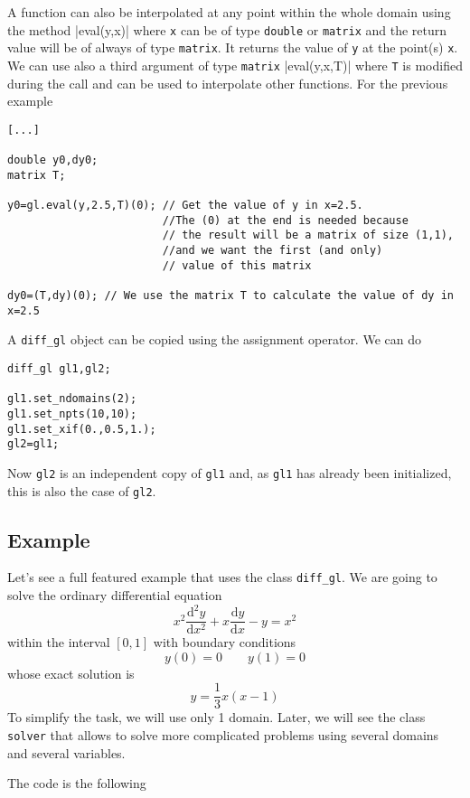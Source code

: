 A function can also be interpolated at any point within the whole domain using the method
|eval(y,x)|
where \texttt{x} can be of type \texttt{double} or \texttt{matrix} and the return value will be 
of always of type \texttt{matrix}. It returns the value of \texttt{y} at the point(s) \texttt{x}.
We can use also a third argument of type \texttt{matrix}
|eval(y,x,T)|
where \texttt{T} is modified during the call and can be used to interpolate other functions. 
For the previous example
\begin{verbatim}
[...]

double y0,dy0;
matrix T;

y0=gl.eval(y,2.5,T)(0); // Get the value of y in x=2.5. 
						//The (0) at the end is needed because
						// the result will be a matrix of size (1,1), 
						//and we want the first (and only)
						// value of this matrix
								
dy0=(T,dy)(0); // We use the matrix T to calculate the value of dy in x=2.5

\end{verbatim}

A {\tt diff\_gl} object can be copied using the assignment operator. We can do
\begin{verbatim}
diff_gl gl1,gl2;

gl1.set_ndomains(2);
gl1.set_npts(10,10);
gl1.set_xif(0.,0.5,1.);
gl2=gl1; 
\end{verbatim}
Now {\tt gl2} is an independent copy of {\tt gl1} and, as {\tt gl1} has already been initialized, this 
is also the case of {\tt gl2}.

\subsection{Example}

Let's see a full featured example that uses the class \texttt{diff\_gl}.
We are going to solve the ordinary differential equation
$$x^2\frac{\mathrm{d}^2y}{\mathrm{d}x^2}+x\frac{\mathrm{d}y}{\mathrm{d}x}-y=x^2$$
within the interval $[0,1]$ with boundary conditions
$$y(0)=0 \qquad y(1)=0$$
whose exact solution is
$$y=\frac{1}{3}x(x-1)$$
To simplify the task, we will use only 1 domain. Later, we will see the class \texttt{solver} that
allows to solve more complicated problems using several domains and several variables.

The code is the following

